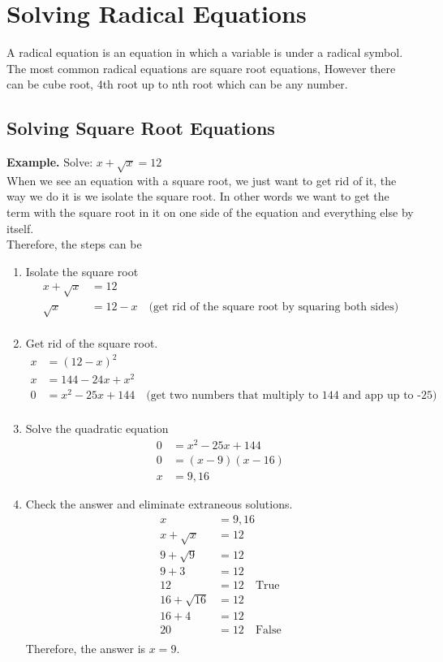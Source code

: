\section{Solving Radical Equations}
A radical equation is an equation in which a variable is under a radical symbol. The most common radical equations are square root equations, However there can be cube root, 4th root up to nth root which can be any number.

\subsection{Solving Square Root Equations} 
\textbf{Example.} Solve: $x+\sqrt{x} = 12$ \\
When we see an equation with a square root, we just want to get rid of it, the way we do it is we isolate the square root. In other words we want to get the term with the square root in it on one side of the equation and everything else by itself. \\

Therefore, the steps can be
\begin{enumerate}
    \item Isolate the square root 
    \begin{align*}
        x+\sqrt{x} &= 12 \\
        \sqrt{x} &= 12-x \quad \text{(get rid of the square root by squaring both sides)} \\
    \end{align*}
    \item Get rid of the square root. 
    \begin{align*}
        x &= (12-x)^2 \\
        x &= 144 - 24x + x^2 \\
        0 &= x^2 - 25x + 144 \quad \text{(get two numbers that multiply to 144 and app up to -25)} \\ 
    \end{align*}
   \item Solve the quadratic equation
    \begin{align*}
         0 &= x^2 - 25x + 144 \\
         0 &= (x-9)(x-16) \\
         x &= 9, 16
    \end{align*}
    \item Check the answer and eliminate extraneous solutions. 
    \begin{align*}
        x &= 9, 16 \\
        x+\sqrt{x} &= 12 \\
        9+\sqrt{9} &= 12 \\
        9+3 &= 12 \\
        12 &= 12 \quad \text{True} \\
        16+\sqrt{16} &= 12 \\
        16+4 &= 12 \\
        20 &= 12 \quad \text{False} \\
    \end{align*}
    Therefore, the answer is $x=9$.
\end{enumerate}

